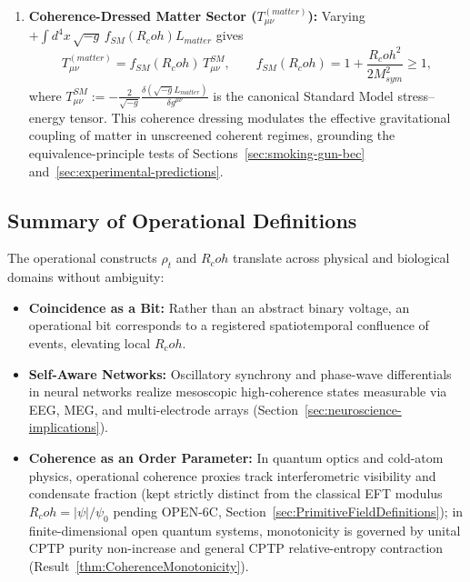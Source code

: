 \documentclass[american,11pt,letterpaper]{article}
\newcommand{\Rcoh}{R_{\mathrm{coh}}}
\def\mathcal#1{#1}%
\def\mathrm#1{#1}%
\def\texttt#1{#1}%
\def\Rcoh{R_coh}%
\begin{document}
\begin{enumerate}[leftmargin=2em]
  yielding $T_{00}^{(\mathrm{pot})} = +V_{\mathrm{tot}}(\rho_t, |\psi|) \ge 0$ in $(-,+,+,+)$ and vanishing identically at the equilibrium vacuum $(\rho_0, v_0)$.
  \item \textbf{Coherence-Dressed Matter Sector ($T_{\mu\nu}^{(\mathrm{matter})}$):} Varying $+\int d^4x\,\sqrt{-g}\,f_{\mathrm{SM}}(\Rcoh)\mathcal{L}_{\mathrm{matter}}$ gives
  \begin{equation}
  T_{\mu\nu}^{(\mathrm{matter})}
  = f_{\mathrm{SM}}(\Rcoh)\,T_{\mu\nu}^{\mathrm{SM}},
  \qquad
  f_{\mathrm{SM}}(\Rcoh) = 1 + \frac{\Rcoh^2}{2 M_{\mathrm{sym}}^2} \ge 1,
  \label{eq:T_matt_sec4}
  \end{equation}
  where $T_{\mu\nu}^{\mathrm{SM}} := -\frac{2}{\sqrt{-g}}\frac{\delta(\sqrt{-g}\mathcal{L}_{\mathrm{matter}})}{\delta g^{\mu\nu}}$ is the canonical Standard Model stress--energy tensor. This coherence dressing modulates the effective gravitational coupling of matter in unscreened coherent regimes, grounding the equivalence-principle tests of Sections~\ref{sec:smoking-gun-bec} and~\ref{sec:experimental-predictions}.
\end{enumerate}

\subsection{Summary of Operational Definitions}

The operational constructs $\rho_t$ and $\Rcoh$ translate across physical and biological domains without ambiguity:
\begin{itemize}
  \item \textbf{Coincidence as a Bit:} Rather than an abstract binary voltage, an operational bit corresponds to a registered spatiotemporal confluence of events, elevating local $\Rcoh$.
  \item \textbf{Self-Aware Networks:} Oscillatory synchrony and phase-wave differentials in neural networks realize mesoscopic high-coherence states measurable via EEG, MEG, and multi-electrode arrays (Section~\ref{sec:neuroscience-implications}).
  \item \textbf{Coherence as an Order Parameter:} In quantum optics and cold-atom physics, operational coherence proxies track interferometric visibility and condensate fraction (kept strictly distinct from the classical EFT modulus $\Rcoh = |\psi|/\psi_0$ pending \texttt{OPEN-6C}, Section~\ref{sec:PrimitiveFieldDefinitions}); in finite-dimensional open quantum systems, monotonicity is governed by unital CPTP purity non-increase and general CPTP relative-entropy contraction (Result~\ref{thm:CoherenceMonotonicity}).
\end{itemize}
\end{document}
